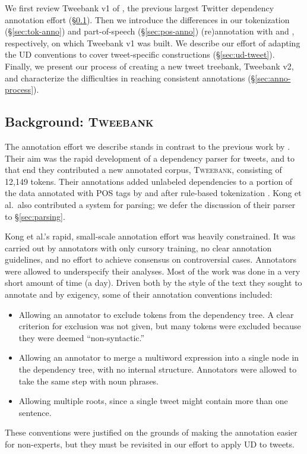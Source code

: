 \documentclass[11pt,a4paper]{article}
\begin{document}
We first review {\sc Tweebank v1} of \citet{kong-EtAl:2014:EMNLP2014},
the previous largest Twitter dependency annotation effort 
(\S\ref{sec:tweebank}).
Then we introduce the differences in our tokenization
(\S\ref{sec:tok-anno}) and part-of-speech (\S\ref{sec:pos-anno}) (re)annotation with \citet{ICWSM101540} and 
\citet{gimpel-EtAl:2011:ACL-HLT2011}, respectively, on which {\sc Tweebank v1} was built. 
We describe our effort of adapting the
UD conventions to cover tweet-specific constructions (\S\ref{sec:ud-tweet}). 
Finally, we present our process of creating a new tweet treebank, 
{\sc Tweebank v2}, and characterize
the difficulties in reaching consistent annotations (\S\ref{sec:anno-process}).

\subsection{Background: \textsc{Tweebank}}\label{sec:tweebank}

The annotation effort we describe stands in contrast to the previous work
by .  Their aim was the rapid
development of a dependency parser for tweets, and to that end they
contributed a new annotated corpus, \textsc{Tweebank}, consisting of
12,149 tokens.  Their annotations added unlabeled dependencies to a portion of the data
annotated with POS tags by 
 and
 after rule-based tokenization \citep{ICWSM101540}.
Kong et al.~also contributed a system for parsing;
we defer the discussion of their parser to \S\ref{sec:parsing}.

Kong et al.'s rapid, small-scale annotation effort was heavily constrained.  It was
carried out by annotators with only cursory training, no clear
annotation guidelines, and no effort to achieve consensus on controversial
cases. Annotators were allowed to underspecify their analyses.
Most of the work was done in a very short amount of
time (a day).  Driven both by the style of the text they sought to annotate
and by exigency, some of their annotation conventions included:
\begin{itemize}
\item Allowing an annotator to exclude tokens from the dependency
  tree.  A clear criterion for exclusion was not given, but many
  tokens were excluded because they were deemed ``non-syntactic.''%
\item Allowing an annotator to merge a multiword expression into a
  single node in the dependency tree, with no internal structure.
  Annotators were allowed to take the same step with noun phrases.
\item Allowing multiple roots, since a single tweet might contain more
  than one sentence.
\end{itemize}
These conventions were justified on the grounds of making the
annotation easier for non-experts, but they must be revisited in our
effort to apply UD to tweets.
\end{document}
